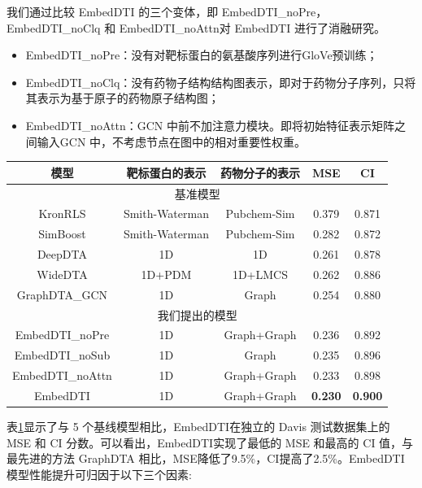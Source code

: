 我们通过比较 EmbedDTI 的三个变体，即 EmbedDTI\_noPre，EmbedDTI\_noClq 和 EmbedDTI\_noAttn对 EmbedDTI 进行了消融研究。

\begin{itemize}
\item [1)] 
EmbedDTI\_noPre：没有对靶标蛋白的氨基酸序列进行GloVe预训练； 
\item [2)]
EmbedDTI\_noClq：没有药物子结构结构图表示，即对于药物分子序列，只将其表示为基于原子的药物原子结构图；
\item [3)]
EmbedDTI\_noAttn：GCN 中前不加注意力模块。即将初始特征表示矩阵之间输入GCN 中，不考虑节点在图中的相对重要性权重。
\end{itemize}

\begin{table}[!htbp]
\centering
{}
\begin{tabular}{c|c|c|c|c}
\toprule
模型 & 靶标蛋白的表示 & 药物分子的表示 & MSE & CI \\ 
\midrule
\multicolumn{5}{c}{基准模型} \\
\midrule
KronRLS & Smith-Waterman & Pubchem-Sim & 0.379 & 0.871\\ 
SimBoost & Smith-Waterman & Pubchem-Sim & 0.282 & 0.872 \\
DeepDTA & 1D & 1D & 0.261 & 0.878 \\
WideDTA & 1D+PDM & 1D+LMCS & 0.262 & 0.886\\
GraphDTA\_GCN & 1D & Graph & 0.254 & 0.880 \\
\midrule
\multicolumn{5}{c}{我们提出的模型} \\
\midrule
EmbedDTI\_noPre & 1D & Graph+Graph & 0.236 & 0.892 \\ 
EmbedDTI\_noSub & 1D & Graph & 0.235 & 0.896 \\
EmbedDTI\_noAttn & 1D & Graph+Graph & 0.233 & 0.898 \\
EmbedDTI & 1D & Graph+Graph & \textbf{0.230} & \textbf{0.900} \\ 
\bottomrule
\end{tabular}
\label{table:davis}
\end{table}

表\ref{table:davis}显示了与 5 个基线模型相比，EmbedDTI在独立的 Davis 测试数据集上的 MSE 和 CI 分数。可以看出，EmbedDTI实现了最低的 MSE 和最高的 CI 值，与最先进的方法 GraphDTA 相比，MSE降低了9.5\%，CI提高了2.5\%。EmbedDTI 模型性能提升可归因于以下三个因素:

